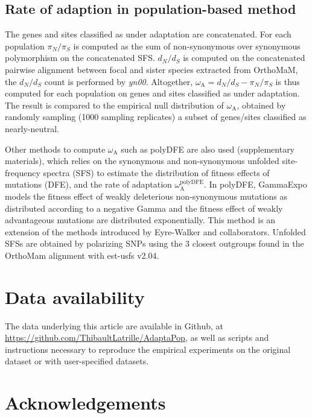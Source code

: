 \documentclass{article}
\newcommand{\dn}{d_N}
\newcommand{\ds}{d_S}
\newcommand{\dnds}{\dn / \ds}
\newcommand{\rateApop}{\omega_{\mathrm{A}}}
\newcommand{\pn}{\pi_N}
\newcommand{\ps}{\pi_S}
\newcommand{\pnps}{\pn / \ps}
\begin{document}
    \subsection*{Rate of adaption in population-based method}

    The genes and sites classified as under adaptation are concatenated.
    For each population $\pnps$ is computed as the sum of non-synonymous over synonymous polymorphism on the concatenated SFS\@.
    $\dnds$ is computed on the concatenated pairwise alignment between focal and sister species extracted from OrthoMaM, the $\dnds$ count is performed by \textit{yn00}.
    Altogether, $\rateApop = \dnds - \pnps$ is thus computed for each population on genes and sites classified as under adaptation.
    The result is compared to the empirical null distribution of $\rateApop$, obtained by randomly sampling (1000 sampling replicates) a subset of genes/sites classified as nearly-neutral.

    Other methods to compute $\rateApop$ such as polyDFE\cite{tataru_polydfe_2020} are also used (supplementary materials), which relies on the synonymous and non-synonymous unfolded site-frequency spectra (SFS) to estimate the distribution of fitness effects of mutations (DFE), and the rate of adaptation $\rateApop^{\mathrm{polyDFE}}$.
    In polyDFE, GammaExpo models the fitness effect of weakly deleterious non-synonymous mutations as distributed according to a negative Gamma and the fitness effect of weakly advantageous mutations are distributed exponentially.
    This method is an extension of the methods introduced by Eyre-Walker and collaborators\cite{eyre-walker_distribution_2006, eyre-walker_estimating_2009}.
    Unfolded SFSs are obtained by polarizing SNPs using the $3$ closest outgroups found in the OrthoMam alignment with est-usfs v2.04\cite{keightley_inferring_2018}.


    \section{Data availability}\label{sec:data-availability}

    The data underlying this article are available in Github, at \url{https://github.com/ThibaultLatrille/AdaptaPop}, as well as scripts and instructions necessary to reproduce the empirical experiments on the original dataset or with user-specified datasets.


    \section{Acknowledgements}\label{sec:acknowledgements}
\end{document}
